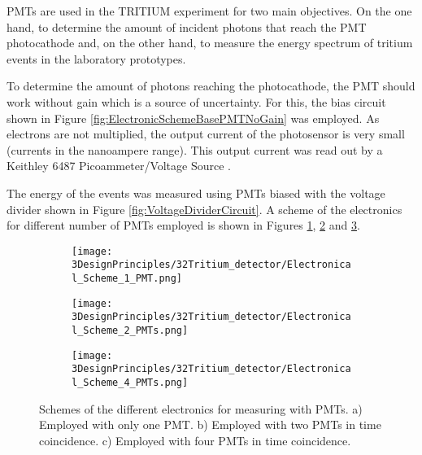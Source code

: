 PMTs are used in the TRITIUM experiment for two main objectives. On the one hand, to determine the amount of incident photons that reach the PMT photocathode and, on the other hand, to measure the energy spectrum of tritium events in the laboratory prototypes.

To determine the amount of photons reaching the photocathode, the PMT should work without gain which is a source of uncertainty. For this, the bias circuit shown in Figure \ref{fig:ElectronicSchemeBasePMTNoGain} was employed. As electrons are not multiplied, the output current of the photosensor is very small (currents in the nanoampere range). This output current was read out by a Keithley 6487 Picoammeter/Voltage Source \cite{DataSheetKeithley6487}. 

The energy of the events was measured using PMTs biased with the voltage divider shown in Figure \ref{fig:VoltageDividerCircuit}. A scheme of the electronics for different number of PMTs employed is shown in Figures \ref{subfig:ElectronicConfiguraiton1PMT}, \ref{subfig:ElectronicConfiguraiton2PMT} and \ref{subfig:ElectronicConfiguraiton4PMT}.

\begin{figure}
\centering
    \begin{subfigure}[b]{1.0\textwidth}
    \centering
    \texttt{[image: 3DesignPrinciples/32Tritium\_detector/Electronical\_Scheme\_1\_PMT.png]}  
    \caption{\label{subfig:ElectronicConfiguraiton1PMT}}
    \end{subfigure}
    \hfill
    \begin{subfigure}[b]{1.0\textwidth}
    \centering
    \texttt{[image: 3DesignPrinciples/32Tritium\_detector/Electronical\_Scheme\_2\_PMTs.png]}  
    \caption{\label{subfig:ElectronicConfiguraiton2PMT}}
    \end{subfigure}
    \hfill
    \begin{subfigure}[b]{1.0\textwidth}
    \centering
    \texttt{[image: 3DesignPrinciples/32Tritium\_detector/Electronical\_Scheme\_4\_PMTs.png]}  
    \caption{\label{subfig:ElectronicConfiguraiton4PMT}}
    \end{subfigure}
 \caption{Schemes of the different electronics for measuring with PMTs. a) Employed with only one PMT. b) Employed with two PMTs in time coincidence. c) Employed with four PMTs in time coincidence.}
 \label{fig:ElectronicConfiguraitonsPMT}
\end{figure}

